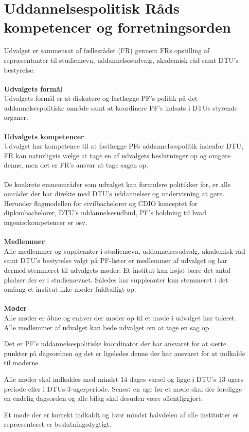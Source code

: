 \section{Uddannelsespolitisk Råds kompetencer og forretningsorden}
Udvalget er sammensat af fællesrådet (FR) gennem FRs opstilling af repræsentanter til studienævn, uddannelsesudvalg, akademisk råd samt DTU’s bestyrelse.\\
\\
\textbf{Udvalgets formål}\\
Udvalgets formål er at diskutere og fastlægge PF's politik på det uddannelsespolitiske område samt at koordinere PF's
indsats i DTUs styrende organer.\\
\\
\textbf{Udvalgets kompetencer}\\
Udvalget har kompetence til at fastlægge PFs uddannelsespolitik indenfor DTU, FR kan naturligvis vælge at tage en af
udvalgets beslutninger op og omgøre denne, men det er FR's ansvar at tage sagen op.
\\
\\
De konkrete emneområder som udvalget kan formulere politikker for, er alle områder der har direkte med DTU's
uddannelser og undervisning at gøre. Herunder flagmodellen for civilbachelorer og CDIO konceptet for diplombachelorer, DTU’s uddannelsesudbud, PF’s holdning til hvad ingeniørkompetencer er osv.
\\
\\
\textbf{Medlemmer}
\\
Alle medlemmer og suppleanter i studienævn, uddannelsesudvalg, akademisk råd samt DTU’s bestyrelse valgt på PF-lister er medlemmer af udvalget og har dermed stemmeret til udvalgets møder. Et institut kan højst bære det antal pladser der er i studienævnet. Således har suppleanter kun stemmeret i det omfang et institut ikke møder fuldtalligt op.
\\
\\
\textbf{Møder}\\
Alle møder er åbne og enhver der møder op til et møde i udvalget har taleret. Alle medlemmer af udvalget kan bede
udvalget om at tage en sag op.

Det er PF's uddannelsespolitiske koordinator der har ansvaret for at sætte punkter på dagsordnen og det er ligeledes
denne der har ansvaret for at indkalde til møderne.

Alle møder skal indkaldes med mindst 14 dages varsel og ligge i DTU's 13 ugers periode eller i DTUs 3-ugerperiode.
Senest en uge før et møde skal der foreligge en endelig dagsorden og alle bilag skal desuden være offentliggjort.

Et møde der er korrekt indkaldt og hvor mindst halvdelen af alle institutter er repræsenteret er beslutningsdygtigt.
